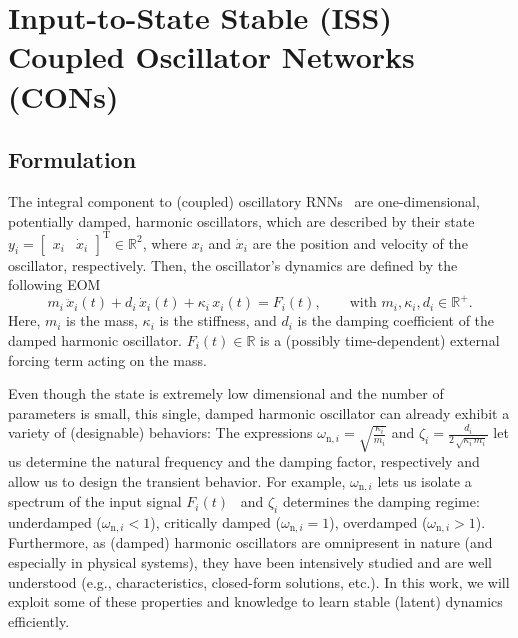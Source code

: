 \section{Input-to-State Stable (ISS) Coupled Oscillator Networks (CONs)}\label{sec:con:con}

\subsection{Formulation} 
The integral component to (coupled) oscillatory \glspl{RNN}~\cite{rusch2020coupled, rusch2021unicornn, ceni2024random, lanthaler2024neural} are one-dimensional, potentially damped, harmonic oscillators, which are described by their state $y_i = \begin{bmatrix}
    x_i & \dot{x}_i
\end{bmatrix}^\mathrm{T} \in \mathbb{R}^2$, where $x_i$ and $\dot{x}_i$ are the position and velocity of the oscillator, respectively. Then, the oscillator's dynamics are defined by the following \gls{EOM}
\begin{equation}\label{eq:con:harmonic_oscillator}
    m_i \, \ddot{x}_i(t) + d_i \, \dot{x}_i(t) + \kappa_i \, x_i(t) = F_i(t),
    \qquad
    \text{with } m_i, \kappa_i, d_i \in \mathbb{R}^+.
\end{equation}
Here, $m_i$ is the mass, $\kappa_i$ is the stiffness, and $d_i$ is the damping coefficient of the damped harmonic oscillator. $F_i(t) \in \mathbb{R}$ is a (possibly time-dependent) external forcing term acting on the mass.

Even though the state is extremely low dimensional and the number of parameters is small, this single, damped harmonic oscillator can already exhibit a variety of (designable) behaviors:
The expressions $\omega_{\mathrm{n},i} = \sqrt{\frac{\kappa_i}{m_i}}$ and $\zeta_i = \frac{d_i}{2 \, \sqrt{\kappa_i \, m_i}}$ let us determine the natural frequency and the damping factor, respectively and allow us to design the transient behavior. For example, $\omega_{\mathrm{n},i}$ lets us isolate a spectrum of the input signal $F_i(t)$~\cite{ceni2024random} and $\zeta_i$ determines the damping regime: underdamped ($\omega_{\mathrm{n},i} < 1$), critically damped ($\omega_{\mathrm{n},i} = 1$), overdamped ($\omega_{\mathrm{n},i} > 1$). 
Furthermore, as (damped) harmonic oscillators are omnipresent in nature (and especially in physical systems), they have been intensively studied and are well understood (e.g., characteristics, closed-form solutions, etc.). 
In this work, we will exploit some of these properties and knowledge to learn stable (latent) dynamics efficiently.

